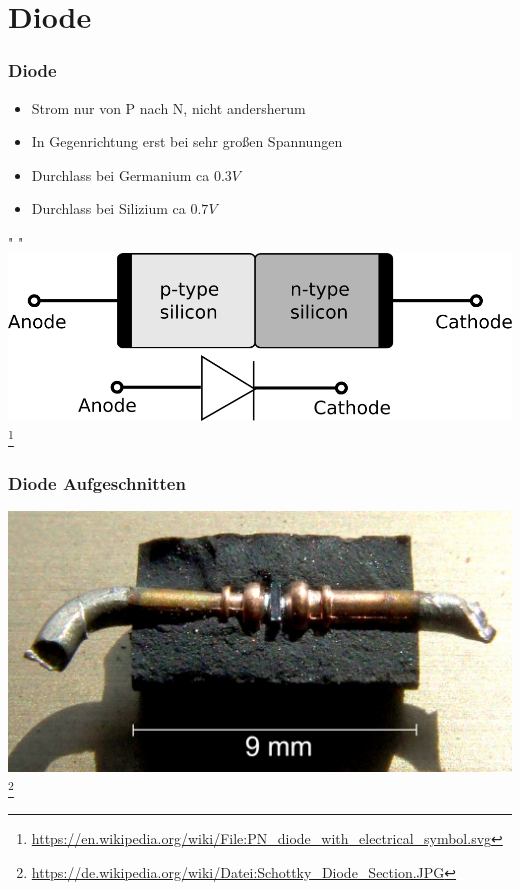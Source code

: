 \section*{Diode}

\begin{frame}
    \frametitle{Diode}
    \begin{center}
    \begin{itemize}
			\item Strom nur von P nach N, nicht andersherum
			\item In Gegenrichtung erst bei sehr großen Spannungen
			\item Durchlass bei Germanium ca $0.3V$
			\item Durchlass bei Silizium ca $0.7V$
    \end{itemize} " "\\
        \includegraphics[width=.7\textwidth]{e12/diode_with_electrical_symbol.png}
        \footnote{\tiny \url{https://en.wikipedia.org/wiki/File:PN_diode_with_electrical_symbol.svg}}
	\end{center}
\end{frame}

\begin{frame}
    \frametitle{Diode Aufgeschnitten}
    \begin{center}
        \includegraphics[width=1\textwidth]{e12/Schottky_Diode_Section.jpg}
        \footnote{\tiny \url{https://de.wikipedia.org/wiki/Datei:Schottky_Diode_Section.JPG}}
	\end{center}
\end{frame}

